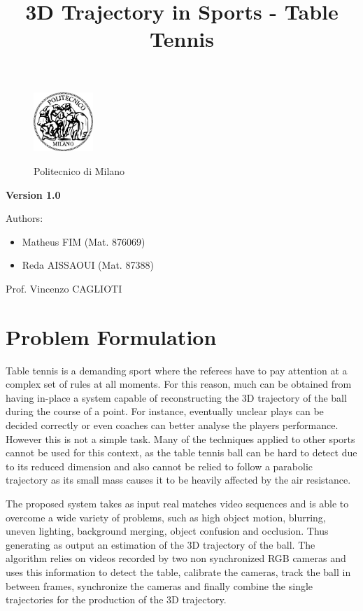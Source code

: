 \documentclass[a4paper]{article}
\title{3D Trajectory in Sports - Table Tennis}
\begin{document}
\begin{titlepage}
\begin{figure}
\centering
\includegraphics[width=0.2\textwidth]{polimi.jpg}
\par
\LARGE Politecnico di Milano
\end{figure}


\maketitle
\textbf{Version 1.0}
\newline

\raggedright
Authors:
\begin{itemize}
	\item Matheus FIM (Mat. 876069)
    \item Reda AISSAOUI (Mat. 87388)

\end{itemize}
\raggedleft
Prof. Vincenzo CAGLIOTI
\thispagestyle{empty}
\end{titlepage}


\tableofcontents
\newpage

\section{Problem Formulation}

Table tennis is a demanding sport where the referees have to pay attention at a complex set of rules at all moments. For this reason, much can be obtained from having in-place a system capable of reconstructing the 3D trajectory of the ball during the course of a point. For instance, eventually unclear plays can be decided correctly or even coaches can better analyse the players performance. However this is not a simple task. Many of the techniques applied to other sports cannot be used for this context, as the table tennis ball can be hard to detect due to its reduced dimension and also cannot be relied to follow a parabolic trajectory as its small mass causes it to be heavily affected by the air resistance.

The proposed system takes as input real matches video sequences and is able to overcome a wide variety of problems, such as high object motion, blurring, uneven lighting, background merging, object confusion and occlusion. Thus generating as output an estimation of the 3D trajectory of the ball. The algorithm relies on videos recorded by two non synchronized RGB  cameras and uses this information to detect the table, calibrate the cameras, track the ball in between frames, synchronize the cameras and finally combine the single trajectories for the production of the 3D trajectory.
\end{document}
